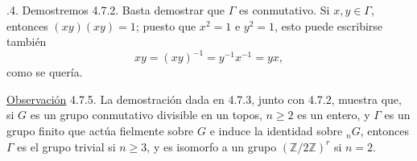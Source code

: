 \smallskip
{}.4. Demostremos 4.7.2. Basta demostrar que $\Gamma$ es conmutativo.
Si $x,y\in\Gamma$, entonces $(xy)(xy)=1$; puesto que $x^2=1$ e $y^2=1$,
esto puede escribirse también
\[
 xy=(xy)^{-1}=y^{-1}x^{-1}=yx,
\]
como se quería.

\medskip
\noindent
\underline{Observación} 4.7.5. La demostración dada en 4.7.3, junto
con 4.7.2, muestra que, si $G$ es un grupo conmutativo divisible en un
topos, $n\geq2$ es un entero, y $\Gamma$ es un grupo finito que actúa
fielmente sobre $G$ e induce la identidad sobre ${}_nG$, entonces
$\Gamma$ es el grupo trivial si $n\geq3$, y es isomorfo a un grupo
$(\mathbb Z/2\mathbb Z)^r$ si $n=2$.

